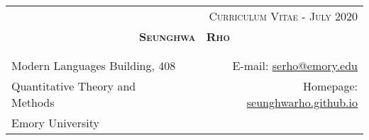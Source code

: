 \documentclass[10pt]{article}
\begin{document}
\begin{center}
\begin{tabular}{lr}
& \textsc{Curriculum Vitae - July 2020} \\
\multicolumn{2}{c}{{\Large \textsc{\textbf{Seunghwa \ Rho }}}}\\ 
\multicolumn{2}{p{510pt}}{}\\
\hline\\
Modern Languages Building, 408   & E-mail: \href{mailto:serho@emory.edu}{serho@emory.edu} \\
\multicolumn{1}{l}{Quantitative Theory and Methods}& Homepage: \href{https://seunghwarho.github.io}{seunghwarho.github.io}\\
\multicolumn{2}{l}{Emory University}\\
\end{tabular}


\end{center}
\end{document}
